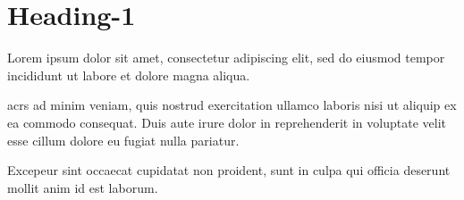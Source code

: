 \section{Heading-1}\label{heading-1}
Lorem ipsum dolor sit amet, consectetur adipiscing elit, sed do eiusmod tempor
incididunt ut labore et dolore magna aliqua.

\acp{acr} ad minim veniam, quis nostrud exercitation ullamco laboris nisi ut aliquip ex ea commodo consequat. Duis aute irure dolor in reprehenderit in voluptate velit esse cillum dolore eu fugiat nulla pariatur.

 Excepeur sint occaecat cupidatat non proident, sunt in culpa qui officia deserunt mollit anim id est laborum.
